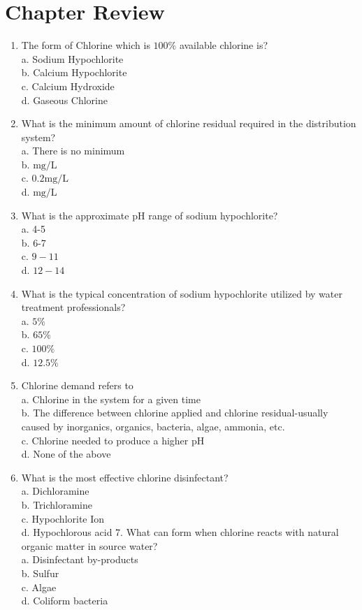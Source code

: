 \documentclass[10pt]{article}
\begin{document}
\section{Chapter Review}
\begin{enumerate}
  \item The form of Chlorine which is $100 \%$ available chlorine is?\\
a. Sodium Hypochlorite\\
b. Calcium Hypochlorite\\
c. Calcium Hydroxide\\
d. Gaseous Chlorine

  \item What is the minimum amount of chlorine residual required in the distribution system?\\
a. There is no minimum\\
b. $\mathrm{mg} / \mathrm{L}$\\
c. $0.2 \mathrm{mg} / \mathrm{L}$\\
d. $\mathrm{mg} / \mathrm{L}$

  \item What is the approximate $\mathrm{pH}$ range of sodium hypochlorite?\\
a. 4-5\\
b. 6-7\\
c. $9-11$\\
d. $12-14$

  \item What is the typical concentration of sodium hypochlorite utilized by water treatment professionals?\\
a. $5 \%$\\
b. $65 \%$\\
c. $100 \%$\\
d. $12.5 \%$

  \item Chlorine demand refers to\\
a. Chlorine in the system for a given time\\
b. The difference between chlorine applied and chlorine residual-usually caused by inorganics, organics, bacteria, algae, ammonia, etc.\\
c. Chlorine needed to produce a higher $\mathrm{pH}$\\
d. None of the above

  \item What is the most effective chlorine disinfectant?\\
a. Dichloramine\\
b. Trichloramine\\
c. Hypochlorite Ion\\
d. Hypochlorous acid 7. What can form when chlorine reacts with natural organic matter in source water?\\
a. Disinfectant by-products\\
b. Sulfur\\
c. Algae\\
d. Coliform bacteria


\end{enumerate}
\end{document}
